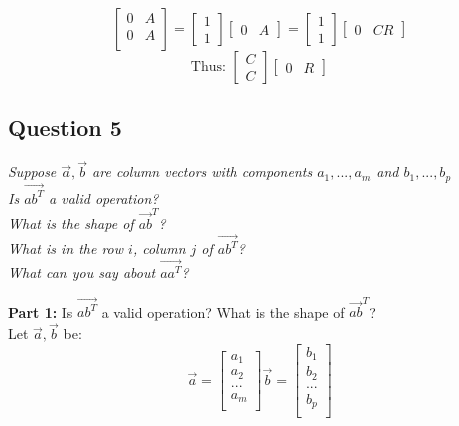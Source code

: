 \documentclass[11pt]{article}
\theoremstyle{plain}
\begin{document}
\[
	\begin{bmatrix}
		0 & A \\
		0 & A \\
	\end{bmatrix}
	=
	\begin{bmatrix}
		1 \\ 1
	\end{bmatrix}
	\begin{bmatrix}
		0 & A
	\end{bmatrix}
	=
	\begin{bmatrix}
		1 \\ 1
	\end{bmatrix}
	\begin{bmatrix}
		0 & CR
	\end{bmatrix}
\]
\[
    \text{Thus: }
    \begin{bmatrix}
        C \\ C
    \end{bmatrix}
    \begin{bmatrix}
        0 & R
    \end{bmatrix}
\] 
\begin{center}
	\section*{Question 5}
\end{center}
\begin{center}
	\textit{Suppose $\vec{a},\vec{b}$ are column vectors with components $a_1,...,a_m$ and $b_1,...,b_p$\\
		Is $\vec{ab^T}$ a valid operation? \\
		What is the shape of $\vec{ab}^T$? \\
		What is in the row $i$, column $j$ of $\vec{ab^T}$?\\
		What can you say about $\vec{aa^T}$?
	}
\end{center}
\textbf{Part 1:} Is $\vec{ab^T}$ a valid operation? What is the shape of $\vec{ab}^T$? \\
Let $\vec{a},\vec{b}$ be:
\[
	\vec{a} = \begin{bmatrix}
		a_1 \\
		a_2 \\
		... \\
		a_m \\
	\end{bmatrix}
	\vec{b} = \begin{bmatrix}
		b_1 \\
		b_2 \\
		... \\
		b_p \\
	\end{bmatrix}
\]
\end{document}

